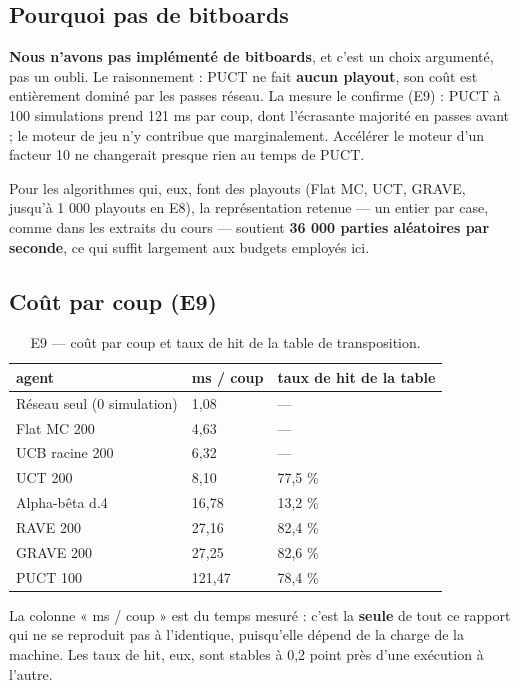 \documentclass[11pt,a4paper]{article}
\begin{document}
\subsection{Pourquoi pas de bitboards}\label{pourquoi-pas-de-bitboards}

\textbf{Nous n'avons pas implémenté de bitboards}, et c'est un choix argumenté, pas un
oubli. Le raisonnement : PUCT ne fait \textbf{aucun playout}, son coût est
entièrement dominé par les passes réseau. La mesure le confirme (E9) : PUCT à
100 simulations prend 121 ms par coup, dont l'écrasante majorité en passes avant ;
le moteur de jeu n'y contribue que marginalement. Accélérer le moteur d'un facteur
10 ne changerait presque rien au temps de PUCT.

Pour les algorithmes qui, eux, font des playouts (Flat MC, UCT, GRAVE, jusqu'à
1 000 playouts en E8), la représentation retenue --- un entier par case, comme dans
les extraits du cours --- soutient \textbf{36 000 parties aléatoires par seconde}, ce
qui suffit largement aux budgets employés ici.

\subsection{Coût par coup (E9)}\label{couxfbt-par-coup-e9}

\begin{table}[htbp]
\centering\small
\caption{E9 --- coût par coup et taux de hit de la table de transposition.}
\label{tab:e9}
\begin{tabular}{@{}lll@{}}
\toprule
agent & ms / coup & taux de hit de la table \\
\midrule
Réseau seul (0 simulation) & 1,08 & --- \\
Flat MC 200 & 4,63 & --- \\
UCB racine 200 & 6,32 & --- \\
UCT 200 & 8,10 & 77,5 \% \\
Alpha-bêta d.4 & 16,78 & 13,2 \% \\
RAVE 200 & 27,16 & 82,4 \% \\
GRAVE 200 & 27,25 & 82,6 \% \\
PUCT 100 & 121,47 & 78,4 \% \\
\bottomrule
\end{tabular}
\end{table}

La colonne « ms / coup » est du temps mesuré : c'est la \textbf{seule} de tout ce
rapport qui ne se reproduit pas à l'identique, puisqu'elle dépend de la charge de
la machine. Les taux de hit, eux, sont stables à 0,2 point près d'une exécution
à l'autre.
\end{document}
